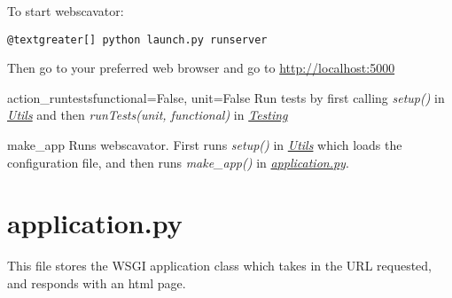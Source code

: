 \documentclass[letterpaper,10pt,english]{manual}
\begin{document}
To start webscavator:

\begin{Verbatim}[commandchars=@\[\]]
@textgreater[] python launch.py runserver
\end{Verbatim}

Then go to your preferred web browser and go to \href{http://localhost:5000}{http://localhost:5000}

\hypertarget{launch.action_runtests}{}\begin{funcdesc}{action\_runtests}{functional=False, unit=False}
Run tests by first calling \emph{setup()} in \hyperlink{--doc-utils}{\emph{Utils}} and then \emph{runTests(unit, functional)} in 
\hyperlink{--doc-testing}{\emph{Testing}}
\end{funcdesc}

\hypertarget{launch.make_app}{}\begin{funcdesc}{make\_app}{}
Runs webscavator. First runs \emph{setup()} in \hyperlink{--doc-utils}{\emph{Utils}} 
which loads the configuration file, and 
then runs \emph{make\_app()} in \hyperlink{--doc-application}{\emph{application.py}}.
\end{funcdesc}

\resetcurrentobjects
\hypertarget{--doc-application}{}

\section{application.py}
\hypertarget{module-webscavator.application}{}
\modulesynopsis{}
This file stores the WSGI application class which takes in the URL requested, 
and responds with an html page.
\end{document}
